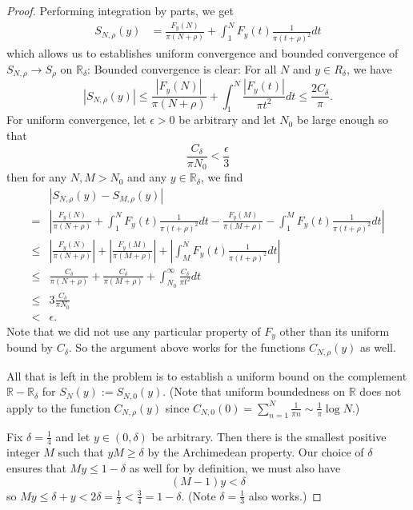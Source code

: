 \documentclass[12pt]{article}
\newcommand{\R}{\mathbb{R}}
\newcommand{\Abs}[1]{\left| #1 \right|}
\begin{document}
\begin{proof}
Performing integration by parts, we get
\begin{align}
S_{N,\rho}(y) &= \frac{F_y(N)}{\pi (N + \rho)} + \int_1^N F_y(t) \frac{1}{\pi (t + \rho)^2} dt \label{eq:SN_Int_Part}
\end{align}
which allows us to establishes uniform convergence and bounded convergence of $S_{N,\rho} \rightarrow S_\rho$ on $\R_\delta$: Bounded convergence is clear: For all $N$ and $y \in R_\delta$, we have
$$|S_{N,\rho}(y)| \leq \frac{\Abs{F_y(N)}}{\pi (N + \rho)} + \int_1^N \frac{|F_y(t)|}{\pi t^2} dt \leq \frac{2 C_\delta}{\pi}.$$
For uniform convergence, let $\epsilon > 0$ be arbitrary and let $N_0$ be large enough so that
$$\frac{C_\delta}{\pi N_0} < \frac{\epsilon}{3}$$
then for any $N, M > N_0$ and any $y \in \R_\delta$, we find
\begin{align*}
&\Abs{ S_{N,\rho}(y) - S_{M,\rho}(y) }\\
=& \Abs{ \frac{F_y(N)}{\pi (N + \rho)} + \int_1^N F_y(t) \frac{1}{\pi (t + \rho)^2} dt - \frac{F_y(M)}{\pi (M + \rho)} - \int_1^M F_y(t) \frac{1}{\pi (t + \rho)^2} dt } \\
\leq& \Abs{ \frac{F_y(N)}{\pi (N + \rho)} } + \Abs{ \frac{F_y(M)}{\pi (M + \rho)} } + \Abs{ \int_M^N F_y(t) \frac{1}{\pi (t + \rho)^2} dt } \\
\leq& \frac{C_\delta}{\pi (N + \rho)} + \frac{C_\delta}{\pi (M + \rho)} + \int_{N_0}^{\infty} \frac{C_\delta}{\pi t^2} dt \\
\leq& 3 \frac{C_\delta}{\pi N_0} \\
<& \epsilon.
\end{align*}
Note that we did not use any particular property of $F_y$ other than its uniform bound by $C_\delta$. So the argument above works for the functions $C_{N,\rho}(y)$ as well.

All that is left in the problem is to establish a uniform bound on the complement $\R - \R_\delta$ for $S_N(y) := S_{N, 0}(y)$. (Note that uniform boundedness on $\R$ does not apply to the function $C_{N, \rho}(y)$ since $C_{N, 0}(0) = \sum_{n = 1}^N \frac{1}{\pi n} \sim \frac{1}{\pi} \log N$.)

Fix $\delta = \frac14$ and let $y \in (0, \delta)$ be arbitrary. Then there is the smallest positive integer $M$ such that $y M \geq \delta$ by the Archimedean property. Our choice of $\delta$ ensures that $My \leq 1 - \delta$ as well for by definition, we must also have
$$(M - 1)y < \delta$$
so $My \leq \delta + y < 2 \delta = \frac{1}{2} < \frac34 = 1 - \delta$. (Note $\delta = \frac13$ also works.)


\end{proof}
\end{document}
